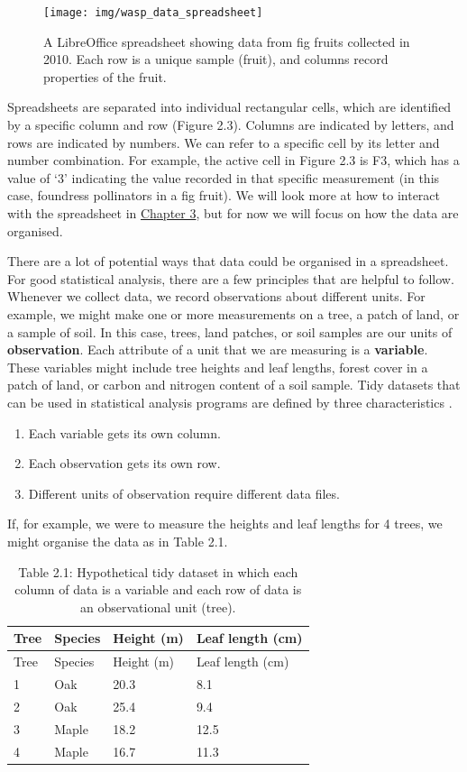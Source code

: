 \documentclass[
]{scrbook}
\providecommand{\tightlist}{%
  \setlength{\itemsep}{0pt}\setlength{\parskip}{0pt}}
\begin{document}
\begin{figure}
\texttt{[image: img/wasp\_data\_spreadsheet]} \caption{A LibreOffice spreadsheet showing data from fig fruits collected in 2010. Each row is a unique sample (fruit), and columns record properties of the fruit.}\label{fig:unnamed-chunk-6}
\end{figure}

Spreadsheets are separated into individual rectangular cells, which are identified by a specific column and row (Figure 2.3).
Columns are indicated by letters, and rows are indicated by numbers.
We can refer to a specific cell by its letter and number combination.
For example, the active cell in Figure 2.3 is F3, which has a value of `3' indicating the value recorded in that specific measurement (in this case, foundress pollinators in a fig fruit).
We will look more at how to interact with the spreadsheet in \protect\hyperlink{Chapter_3}{Chapter 3}, but for now we will focus on how the data are organised.

There are a lot of potential ways that data could be organised in a spreadsheet.
For good statistical analysis, there are a few principles that are helpful to follow.
Whenever we collect data, we record observations about different units.
For example, we might make one or more measurements on a tree, a patch of land, or a sample of soil.
In this case, trees, land patches, or soil samples are our units of \textbf{observation}.
Each attribute of a unit that we are measuring is a \textbf{variable}.
These variables might include tree heights and leaf lengths, forest cover in a patch of land, or carbon and nitrogen content of a soil sample.
Tidy datasets that can be used in statistical analysis programs are defined by three characteristics \citep{Wickham2014}.

\begin{enumerate}
\def\labelenumi{\arabic{enumi}.}
\tightlist
\item
  Each variable gets its own column.
\item
  Each observation gets its own row.
\item
  Different units of observation require different data files.
\end{enumerate}

If, for example, we were to measure the heights and leaf lengths for 4 trees, we might organise the data as in Table 2.1.

\begin{longtable}[]{@{}llll@{}}
\caption{Table 2.1: Hypothetical tidy dataset in which each column of data is a variable and each row of data is an observational unit (tree).}\tabularnewline
\toprule
Tree & Species & Height (m) & Leaf length (cm) \\
\midrule
\endfirsthead
\toprule
Tree & Species & Height (m) & Leaf length (cm) \\
\midrule
\endhead
1 & Oak & 20.3 & 8.1 \\
2 & Oak & 25.4 & 9.4 \\
3 & Maple & 18.2 & 12.5 \\
4 & Maple & 16.7 & 11.3 \\
\bottomrule
\end{longtable}
\end{document}
